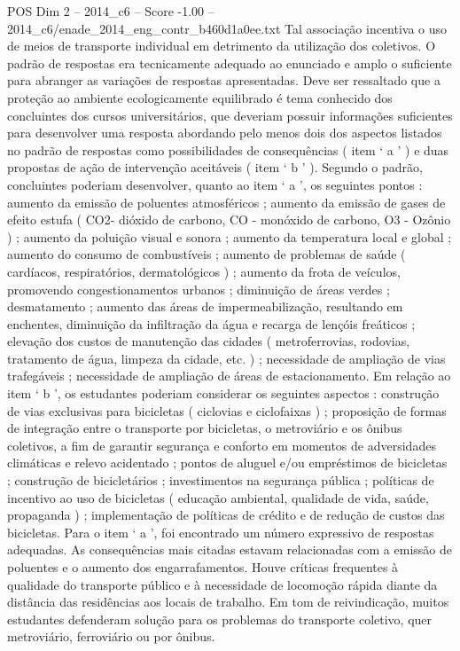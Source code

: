 \begin{textsample}{POS Dim 2 – 2014\_c6 – Score -1.00 – 2014\_c6/enade\_2014\_eng\_contr\_b460d1a0ee.txt}
Tal associação incentiva o uso de meios de transporte individual em detrimento da utilização dos coletivos.
O padrão de respostas era tecnicamente adequado ao enunciado e amplo o suficiente para abranger as variações de respostas apresentadas.
Deve ser ressaltado que a proteção ao ambiente ecologicamente equilibrado é tema conhecido dos concluintes dos cursos universitários, que deveriam possuir informações suficientes para desenvolver uma resposta abordando pelo menos dois dos aspectos listados no padrão de respostas como possibilidades de consequências ( item ‘ a ’ ) e duas propostas de ação de intervenção aceitáveis ( item ‘ b ’ ).
Segundo o padrão, concluintes poderiam desenvolver, quanto ao item ‘ a ’, os seguintes pontos : aumento da emissão de poluentes atmosféricos ; aumento da emissão de gases de efeito estufa ( CO2- dióxido de carbono, CO - monóxido de carbono, O3 - Ozônio ) ; aumento da poluição visual e sonora ; aumento da temperatura local e global ; aumento do consumo de combustíveis ; aumento de problemas de saúde ( cardíacos, respiratórios, dermatológicos ) ; aumento da frota de veículos, promovendo congestionamentos urbanos ; diminuição de áreas verdes ; desmatamento ; aumento das áreas de impermeabilização, resultando em enchentes, diminuição da infiltração da água e recarga de lençóis freáticos ; elevação dos custos de manutenção das cidades ( metroferrovias, rodovias, tratamento de água, limpeza da cidade, etc. ) ; necessidade de ampliação de vias trafegáveis ; necessidade de ampliação de áreas de estacionamento.
Em relação ao item ‘ b ’, os estudantes poderiam considerar os seguintes aspectos : construção de vias exclusivas para bicicletas ( ciclovias e ciclofaixas ) ; proposição de formas de integração entre o transporte por bicicletas, o metroviário e os ônibus coletivos, a fim de garantir segurança e conforto em momentos de adversidades climáticas e relevo acidentado ; pontos de aluguel e/ou empréstimos de bicicletas ; construção de bicicletários ; investimentos na segurança pública ; políticas de incentivo ao uso de bicicletas ( educação ambiental, qualidade de vida, saúde, propaganda ) ; implementação de políticas de crédito e de redução de custos das bicicletas.
Para o item ‘ a ’, foi encontrado um número expressivo de respostas adequadas.
As consequências mais citadas estavam relacionadas com a emissão de poluentes e o aumento dos engarrafamentos.
Houve críticas frequentes à qualidade do transporte público e à necessidade de locomoção rápida diante da distância das residências aos locais de trabalho.
Em tom de reivindicação, muitos estudantes defenderam solução para os problemas do transporte coletivo, quer metroviário, ferroviário ou por ônibus.

\end{textsample}
